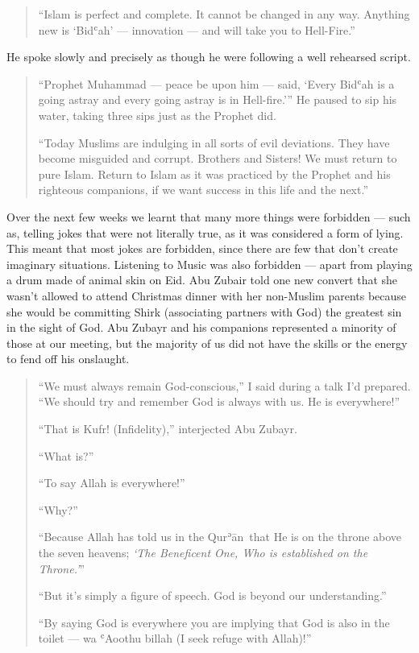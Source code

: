 \documentclass[12pt]{memoir}
\def\´{ʾ} %
\def\`{ʿ} %
\def \Quran{Qur\-\´ān} %
\def\–{-\hskip0pt}
\begin{document}
\begin{quote}
“Islam is perfect and complete.
It cannot be changed in any way.
Anything new is ‘Bid\`ah’ — innovation — and will take you to Hell-Fire.”
\end{quote}

He spoke slowly and precisely
as though he were following a well rehearsed script.

\begin{quote}
“Prophet Muhammad — peace be upon him — said,
‘Every Bid\`ah is a going astray and every going astray is in Hell-fire.’”
He paused to sip his water, taking three sips just as the Prophet did.

“Today Muslims are indulging in all sorts of evil deviations.
They have become misguided and corrupt.
Brothers and Sisters!
We must return to pure Islam.
Return to Islam as it was practiced by the Prophet
and his righteous companions,
if we want success in this life and the next.”
\end{quote}

Over the next few weeks we learnt that many more things were forbidden —
such as, telling jokes that were not literally true,
as it was considered a form of lying.
This meant that most jokes are forbidden,
since there are few that don’t create imaginary situations.
Listening to Music was also forbidden —
apart from playing a drum made of animal skin on Eid.
Abu Zubair told one new convert that she wasn’t allowed
to attend Christmas dinner with her non-Muslim parents
because she would be committing Shirk (associating partners with God)
the greatest sin in the sight of God.
Abu Zubayr and his companions represented a minority of those at our meeting,
but the majority of us did not have the skills
or the energy to fend off his onslaught.

\begin{quote}
“We must always remain God\–conscious,”
I said during a talk I’d prepared.
“We should try and remember God is always with us. He is everywhere!”

“That is Kufr! (Infidelity),” interjected Abu Zubayr.

“What is?”

“To say Allah is everywhere!”

“Why?”

“Because Allah has told us in the \Quran\
that He is on the throne above the seven heavens;
\emph{‘The Beneficent One, Who is established on the Throne.’}”

“But it’s simply a figure of speech.
God is beyond our understanding.”

“By saying God is everywhere you are implying that God is also in the toilet —
wa \`Aoothu billah (I seek refuge with Allah)!”
\end{quote}
\end{document}
